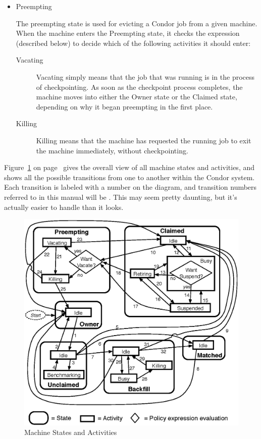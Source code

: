\begin{itemize}
\begin{description}
\end{description}

\item Preempting

  The preempting state is used for evicting a Condor job from a given
  machine.  When the machine enters the Preempting state, it checks the
   expression (described below) to decide which of
  the following activities it should enter:

\begin{description}
  
\item[Vacating] Vacating simply means that the job that was running is
  in the process of checkpointing.  As soon as the checkpoint process
  completes, the machine moves into either the Owner state or the
  Claimed state, depending on why it began preempting in the first
  place.
  
\item[Killing] Killing means that the machine has requested the running
  job to exit the machine immediately, without checkpointing.

\end{description}

\end{itemize}

Figure~\ref{fig:machine-activities} on
page~\pageref{fig:machine-activities} gives the overall view of all
machine states and activities, and shows all the possible transitions
from one to another within the Condor system.  
Each transition is labeled with a number on the diagram, and
transition numbers referred to in this manual will be .  
This may seem pretty daunting, but it's actually easier to handle than
it looks.

\begin{figure}[hbt]
\centering
\includegraphics{admin-man/machine-activities.eps}
\caption{\label{fig:machine-activities}Machine States and Activities}
\end{figure}

